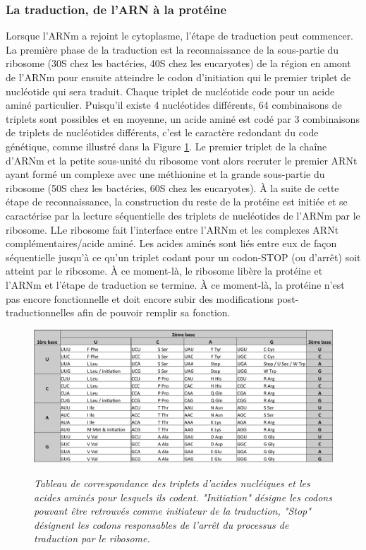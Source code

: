 

\subsubsection{La traduction, de l'ARN à la protéine}

Lorsque l'ARNm a rejoint le cytoplasme, l'étape de traduction peut commencer. La première phase de la traduction est la reconnaissance de la sous-partie du ribosome (30S chez les bactéries, 40S chez les eucaryotes) de la région en amont de l'ARNm pour ensuite atteindre le codon d'initiation qui le premier triplet de nucléotide qui sera traduit. Chaque triplet de nucléotide code pour un acide aminé particulier. Puisqu'il existe 4 nucléotides différents, 64 combinaisons de triplets sont possibles et en moyenne, un acide aminé est codé par 3 combinaisons de triplets de nucléotides différents, c'est le caractère redondant du code génétique, comme illustré dans la Figure \ref{Fig:codon_table}. 
Le premier triplet de la chaîne d'ARNm et la petite sous-unité du ribosome vont alors recruter le premier ARNt ayant formé un complexe avec une méthionine et la grande sous-partie du ribosome (50S chez les bactéries, 60S chez les eucaryotes). À la suite de cette étape de reconnaissance, la construction du reste de la protéine est initiée et se caractérise par la lecture séquentielle des triplets de nucléotides de l'ARNm par le ribosome. LLe ribosome fait l'interface entre l'ARNm et les complexes ARNt complémentaires/acide aminé. Les acides aminés sont liés entre eux de façon séquentielle jusqu'à ce qu'un triplet codant pour un codon-STOP (ou d'arrêt) soit atteint par le ribosome. À ce moment-là, le ribosome libère la protéine et l'ARNm et l'étape de traduction se termine. À ce moment-là, la protéine n'est pas encore fonctionnelle et doit encore subir des modifications post-traductionnelles afin de pouvoir remplir sa fonction.

\begin{figure}
  \centering
  {\includegraphics[width=0.75\linewidth]{./figures/ch1/codon_table.pdf}}
    \caption{\it Tableau de correspondance des triplets d'acides nucléiques et les acides aminés pour lesquels ils codent. "Initiation" désigne les codons pouvant être retrouvés comme initiateur de la traduction, "Stop" désignent les codons responsables de l'arrêt du processus de traduction par le ribosome.}
    \label{Fig:codon_table}
  \hspace{0.3cm}
\end{figure}

